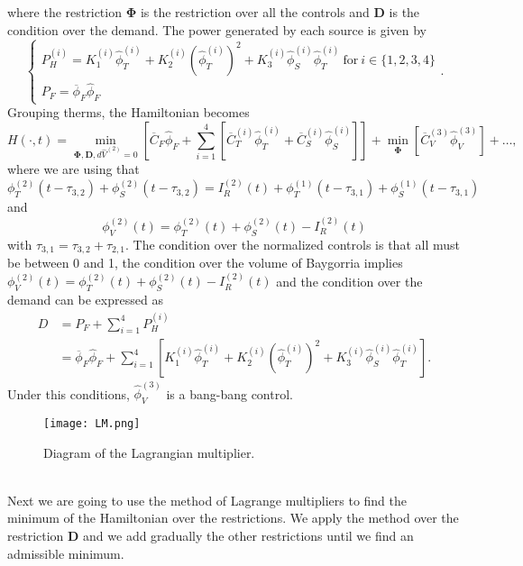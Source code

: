 \documentclass[12pt]{article}
\theoremstyle{definition}
\theoremstyle{remark}
\begin{document}
where the restriction $\bm{\Phi}$ is the restriction over all the controls and $\bm{D}$ is the condition over the demand. The power generated by each source is given by
\begin{equation*}
\begin{cases}
P_H^{(i)}=K_1^{(i)}\hat{\phi}_T^{(i)}+K_2^{(i)}(\hat{\phi}_T^{(i)})^2+K_3^{(i)}\hat{\phi}_S^{(i)}\hat{\phi}_T^{(i)}\ \text{for}\ i\in\{1,2,3,4\}\\
P_F=\overline{\phi}_F\hat{\phi}_F
\end{cases}.
\end{equation*}
Grouping therms, the Hamiltonian becomes
\begin{equation*}
H(\cdot,t)=\min_{\bm{\Phi},\bm{D},d\hat{V}^{(2)}=0}\left[\overline{C}_F\hat{\phi}_F+\sum_{i=1}^4\left[\overline{C}_T^{(i)}\hat{\phi}_T^{(i)}+\overline{C}_S^{(i)}\hat{\phi}_S^{(i)}\right]\right]+\min_{\bm{\Phi}}\left[\overline{C}_V^{(3)}\hat{\phi}_V^{(3)}\right]+\dots,
\end{equation*}
where we are using that
\begin{equation*}
\phi_T^{(2)}(t-\tau_{3,2})+\phi_S^{(2)}(t-\tau_{3,2})=I_R^{(2)}(t)+\phi_T^{(1)}(t-\tau_{3,1})+\phi_S^{(1)}(t-\tau_{3,1})
\end{equation*}
and
\begin{equation*}
\phi_V^{(2)}(t)=\phi_T^{(2)}(t)+\phi_S^{(2)}(t)-I_R^{(2)}(t)
\end{equation*}
with $\tau_{3,1}=\tau_{3,2}+\tau_{2,1}$. The condition over the normalized controls is that all must be between 0 and 1, the condition over the volume of Baygorria implies $\phi_V^{(2)}(t)=\phi_T^{(2)}(t)+\phi_S^{(2)}(t)-I_R^{(2)}(t)
$ and the condition over the demand can be expressed as
\begin{equation*}
\begin{split}
D&=P_F+\sum_{i=1}^4P_H^{(i)}\\
&=\overline{\phi}_F\hat{\phi}_F+\sum_{i=1}^4\left[K_1^{(i)}\hat{\phi}_T^{(i)}+K_2^{(i)}(\hat{\phi}_T^{(i)})^2+K_3^{(i)}\hat{\phi}_S^{(i)}\hat{\phi}_T^{(i)}\right].
\end{split}
\end{equation*}
Under this conditions, $\hat{\phi}_V^{(3)}$ is a bang-bang control.
\begin{figure}[h!]
\centering
\texttt{[image: LM.png]}
\caption{Diagram of the Lagrangian multiplier.}
\end{figure}\\
Next we are going to use the method of Lagrange multipliers to find the minimum of the Hamiltonian over the restrictions. We apply the method over the restriction $\bm{D}$ and we add gradually the other restrictions until we find an admissible minimum.
\end{document}
